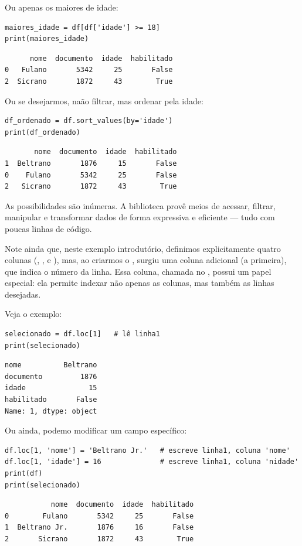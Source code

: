 Ou apenas os maiores de idade:
\begin{verbatim}
maiores_idade = df[df['idade'] >= 18]
print(maiores_idade)
\end{verbatim}
\begin{verbatim}
      nome  documento  idade  habilitado
0   Fulano       5342     25       False
2  Sicrano       1872     43        True
\end{verbatim}

Ou se desejarmos, naão filtrar, mas ordenar pela idade:
\begin{verbatim}
df_ordenado = df.sort_values(by='idade')
print(df_ordenado)
\end{verbatim}
\begin{verbatim}
       nome  documento  idade  habilitado
1  Beltrano       1876     15       False
0    Fulano       5342     25       False
2   Sicrano       1872     43        True
\end{verbatim}

As possibilidades são inúmeras.
A biblioteca provê meios de acessar, filtrar, manipular e transformar dados de forma
expressiva e eficiente — tudo com poucas linhas de código.

Note ainda que, neste exemplo introdutório, definimos explicitamente quatro colunas (, ,
 e ), mas, ao criarmos o , surgiu uma coluna adicional (a primeira),
que indica o número da linha.
Essa coluna, chamada  no , possui um papel especial: ela permite indexar não apenas as
colunas, mas também as linhas desejadas.

Veja o exemplo:
\begin{verbatim}
selecionado = df.loc[1]   # lê linha1
print(selecionado)
\end{verbatim}
\begin{verbatim}
nome          Beltrano
documento         1876
idade               15
habilitado       False
Name: 1, dtype: object
\end{verbatim}

Ou ainda, podemo modificar um campo específico:
\begin{verbatim}
df.loc[1, 'nome'] = 'Beltrano Jr.'   # escreve linha1, coluna 'nome'
df.loc[1, 'idade'] = 16              # escreve linha1, coluna 'nidade'
print(df)
print(selecionado)
\end{verbatim}
\begin{verbatim}
           nome  documento  idade  habilitado
0        Fulano       5342     25       False
1  Beltrano Jr.       1876     16       False
2       Sicrano       1872     43        True
\end{verbatim}


